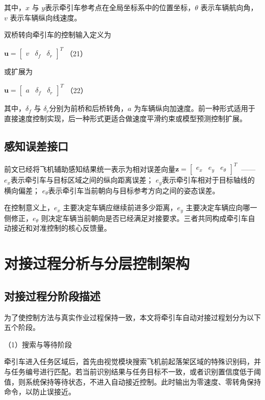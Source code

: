 其中，\(x\) 与 \(y\)表示牵引车参考点在全局坐标系中的位置坐标，\(\theta\)
表示车辆航向角，\(v\) 表示车辆纵向线速度。

双桥转向牵引车的控制输入定义为

\(\mathbf{u} = \begin{bmatrix}
v & \delta_{f} & \delta_{r}
\end{bmatrix}^{T}\) （21）

或扩展为

\(\mathbf{u} = \begin{bmatrix}
a & \delta_{f} & \delta_{r}
\end{bmatrix}^{T}\) （22）

其中，\(\delta_{f}\) 与 \(\delta_{r}\)分别为前桥和后桥转角，\(a\)
为车辆纵向加速度。前一种形式适用于直接速度控制实现，后一种形式更适合做速度平滑约束或模型预测控制扩展。

\subsection{感知误差接口}

前文已经将飞机辅助感知结果统一表示为相对误差向量\(\mathbf{z} = \begin{bmatrix}
e_{x} & e_{y} & e_{\theta}
\end{bmatrix}^{T}\)
\(\ \)------\(e_{x}\)表示牵引车与目标区域之间的纵向距离误差；
\(e_{y}\)表示牵引车相对于目标轴线的横向偏差；
\(e_{\theta}\)表示牵引车当前朝向与目标参考方向之间的姿态误差。

在控制意义上，\(e_{x}\) 主要决定车辆应继续前进多少距离，\(e_{y}\)
主要决定车辆应向哪一侧修正，\(e_{\theta}\)
则决定车辆当前朝向是否已经满足对接要求。三者共同构成牵引车自动接近和对准控制的核心反馈量。

\section{对接过程分析与分层控制架构}

\subsection{对接过程分阶段描述}

为了使控制方法与真实作业过程保持一致，本文将牵引车自动对接过程划分为以下五个阶段。

（1）搜索与等待阶段

牵引车进入任务区域后，首先由视觉模块搜索飞机前起落架区域的特殊识别码，并与任务编号进行匹配。若当前识别结果与任务目标不一致，或者识别置信度低于阈值，则系统保持等待状态，不进入自动接近控制。此时输出为零速度、零转角保持命令，以防止误接近。

